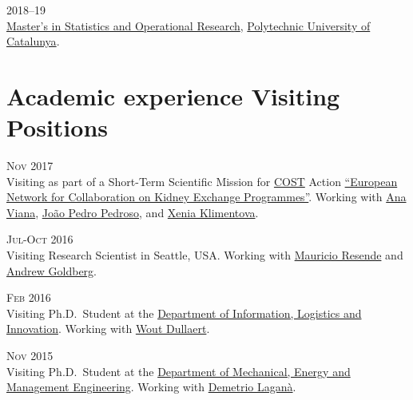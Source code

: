 \begin{paracol}{2}
  \textsc{2018--19}
\switchcolumn
  \\
  \href{https://mesioupcub.masters.upc.edu/en}{Master's in Statistics and Operational Research}, \href{https://www.upc.edu/en}{Polytechnic University of Catalunya}.
\end{paracol}

\section*{Academic experience {\small Visiting Positions}}

\begin{paracol}{2}
  \textsc{Nov 2017}
\switchcolumn
  \\
  Visiting as part of a Short-Term Scientific Mission for \href{http://www.cost.eu/}{COST} Action \href{http://www.enckep-cost.eu/}{``European Network for Collaboration on Kidney Exchange Programmes''}.
  Working with \href{https://scholar.google.com/citations?user=RW7QevYAAAAJ}{Ana Viana}, \href{https://scholar.google.it/citations?user=aWTZf_AAAAAJ}{João Pedro Pedroso}, and \href{http://orcid.org/0000-0003-1085-0810}{Xenia Klimentova}.
\end{paracol}

\begin{paracol}{2}
  \textsc{Jul-Oct 2016}
\switchcolumn
  \\
  Visiting Research Scientist in Seattle, USA. Working with \href{https://scholar.google.com/citations?user=KTmPx50AAAAJ}{Mauricio Resende} and \href{https://scholar.google.it/citations?user=U5iFVowAAAAJ}{Andrew Goldberg}.
\end{paracol}

\begin{paracol}{2}
  \textsc{Feb 2016}
\switchcolumn
  \\
  Visiting Ph.D.\ Student at the \href{https://sbe.vu.nl/en/departments-and-institutes/information-logistics-and-innovation/index.aspx}{Department of Information, Logistics and Innovation}. Working with \href{https://scholar.google.com/citations?user=wjjCd5UAAAAJ}{Wout Dullaert}.
\end{paracol}

\begin{paracol}{2}
  \textsc{Nov 2015}
\switchcolumn
  \\
  Visiting Ph.D.\ Student at the \href{http://www.unical.it/portale/strutture/dipartimenti_240/dimeg/}{Department of Mechanical, Energy and Management Engineering}. Working with \href{https://scholar.google.com/citations?user=r_qFOqgAAAAJ}{Demetrio Laganà}.
\end{paracol}

